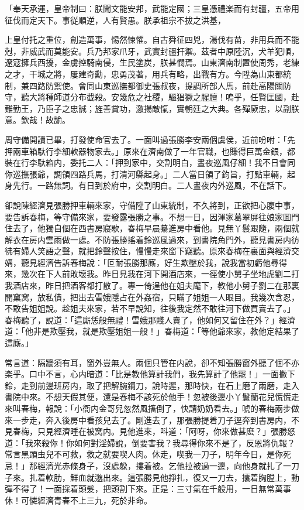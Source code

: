 \begin{myquote}[\markfont]
「奉天承運，皇帝制曰：朕聞文能安邦，武能定國；三皇憑禮楽而有封疆，五帝用征伐而定天下。事従順逆，人有賢愚。朕承祖宗不拔之洪基，

上皇付托之重位，創造萬事，惕然悚懼。自古舜征四兇，湯伐有苗，非用兵而不能尅，非威武而莫能安。兵乃邦家爪牙，武實封疆扞禦。茲者中原陸沉，犬羊犯順，遼寇擁兵西擾，金虜控騎南侵，生民塗炭，朕甚憫焉。山東濟南制置使周秀，老練之才，干城之將，屢建奇勳，忠勇茂著，用兵有略，出戰有方。今陞為山東都統制，兼四路防禦使。會同山東巡撫都御史張叔夜，提調所部人馬，前赴高陽關防守，聽大將種師道分布截殺。安幾危之社稷，驅猖獗之腥膻！嗚乎，任賢匡國，赴難勤王，乃臣子之忠誠；旌善賞功，激揚敵愾，實朝廷之大典。各殫厥忠，以副朕意。欽哉！故諭。


\end{myquote}

周守備開讀已畢，打發使命官去了。一面叫過張勝李安兩個虞侯，近前吩咐：「先押兩車箱馱行李細軟器物家去。」原來在濟南做了一年官職，也賺得巨萬金銀，都裝在行李馱箱内，委托二人：「押到家中，交割明白，晝夜巡風仔細！我不日會同你巡撫張爺，調領四路兵馬，打清河縣起身。」二人當日領了鈞旨，打點車輛，起身先行。一路無詞。有日到於府中，交割明白。二人晝夜内外巡風，不在話下。

卻說陳經濟見張勝押車輛來家，守備陞了山東統制，不久將到，正欲把心腹中事，要告訴春梅，等守備來家，要發露張勝之事。不想一日，因渾家葛翠屏往娘家囬門住去了，他獨自個在西書房寢歇，春梅早晨驀進房中看他。見無丫鬟跟隨，兩個就解衣在房内雲雨做一處。不防張勝搖着鈴巡風過來，到書院角門外，聽見書房内彷彿有婦人笑語之聲，就把鈴聲按住，慢慢走來窗下竊聽。原來春梅在裏面與經濟交媾，聽見經濟告訴春梅說：「叵耐張勝那廝，好生欺壓於我，說我當初虧他尋得來，幾次在下人前敗壞我。昨日見我在河下開酒店來，一徑使小舅子坐地虎劉二打我酒店來，昨日把酒客都打散了。專一倚逞他在姐夫麾下，教他小舅子劉二在那裏開窠窝，放私債，把出去雪娥隱占在外姦宿，只瞞了姐姐一人眼目。我幾次含忍，不敢告姐姐說。趁姐夫來家，若不早說知，往後我定然不敢往河下做買賣去了。」春梅聽了，說道：「這廝恁般無禮！雪娥那賤人賣了，他如何又留住在外？」經濟道：「他非是欺壓我，就是欺壓姐姐一般！」春梅道：「等他爺來家，教他定結果了這廝。」

常言道：隔牆須有耳，窗外豈無人。兩個只管在内說，卻不知張勝窗外聽了個不亦楽乎。口中不言，心内暗道：「比是教他算計我們，我先算計了他罷！」一面撇下鈴，走到前邊班房内，取了把解腕鋼刀，說時遲，那時快，在石上磨了兩磨，走入書院中來。不想天假其便，還是春梅不該死於他手！忽被後邊小丫鬟蘭花兒慌慌走來叫春梅，報說：「小衙内金哥兒忽然風搐倒了，快請奶奶看去。」唬的春梅兩步做來一步走，奔入後房中看孩兒去了。剛進去了，那張勝提着刀子逕奔到書房内，不見春梅，只見經濟睡在被窝内。見他進來，呌道：「阿呀，你來做甚麽？」張勝怒道：「我來殺你！你如何對淫婦說，倒要害我？我尋得你來不是了，反恩將仇報？常言黑頭虫兒不可救，救之就要喫人肉。休走，喫我一刀子，明年今日，是你死忌！」那經濟光赤條身子，沒處躱，摟着被。乞他拉被過一邊，向他身就扎了一刀子來。扎着軟肋，鮮血就邈出來。這張勝見他掙扎，復又一刀去，攮着胸膛上，動彈不得了！一面採着頭髮，把頭割下來。正是：三寸氣在千般用，一日無常萬事休！可憐經濟青春不上三九，死於非命。

